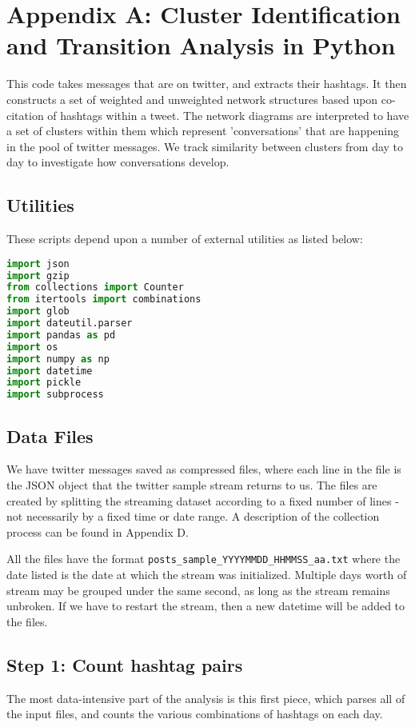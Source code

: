 \documentclass[12pt]{article}
\begin{document}
\section{Appendix A: Cluster Identification and Transition Analysis in Python}

This code takes messages that are on twitter, and extracts their hashtags. It then constructs a set of weighted and unweighted network structures based upon co-citation of hashtags within a tweet. The network diagrams are interpreted to have a set of clusters within them which represent 'conversations' that are happening in the pool of twitter messages. We track similarity between clusters from day to day to investigate how conversations develop.

\subsection{Utilities}
These scripts depend upon a number of external utilities as listed below:

\begin{lstlisting}[language=Python]
import json
import gzip
from collections import Counter
from itertools import combinations
import glob
import dateutil.parser
import pandas as pd
import os
import numpy as np
import datetime
import pickle
import subprocess
\end{lstlisting}

\subsection{Data Files}
We have twitter messages saved as compressed files, where each line in the file is the JSON object that the twitter sample stream returns to us. The files are created by splitting the streaming dataset according to a fixed number of lines - not necessarily by a fixed time or date range. A description of the collection process can be found in Appendix D.

All the files have the format \verb!posts_sample_YYYYMMDD_HHMMSS_aa.txt! where the date listed is the date at which the stream was initialized. Multiple days worth of stream may be grouped under the same second, as long as the stream remains unbroken. If we have to restart the stream, then a new datetime will be added to the files.

\subsection{Step 1: Count hashtag pairs}
The most data-intensive part of the analysis is this first piece, which parses all of the input files, and counts the various combinations of hashtags on each day.
\end{document}
